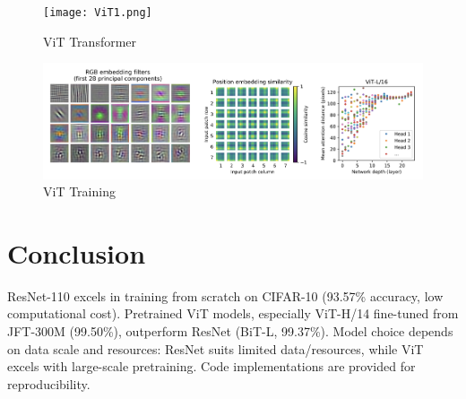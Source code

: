 \documentclass[UTF8]{report}
\theoremstyle{MyLineTheoremStyle} %
\theoremstyle{MyBlockTheoremStyle} %
\theoremstyle{MySubsubsectionStyle} %
\begin{document}
\begin{figure}[H]
    \centering
    \texttt{[image: ViT1.png]}
    \caption{ViT Transformer}
    \label{fig:vit_transformer}
\end{figure}

\begin{figure}[H]
    \centering
    \includegraphics[width=1.0\textwidth]{ViT2.png}
    \caption{ViT Training}
    \label{fig:vit_training}
\end{figure}


\section*{Conclusion}
ResNet-110 excels in training from scratch on CIFAR-10 (93.57\% accuracy, low computational cost). Pretrained ViT models, especially ViT-H/14 fine-tuned from JFT-300M (99.50\%), outperform ResNet (BiT-L, 99.37\%). Model choice depends on data scale and resources: ResNet suits limited data/resources, while ViT excels with large-scale pretraining. Code implementations are provided for reproducibility.
\end{document}

